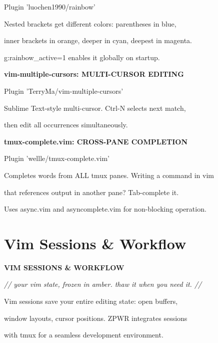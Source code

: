 \documentclass[11pt,a4paper,twoside]{book}
\begin{document}
Plugin 'luochen1990/rainbow'

Nested brackets get different colors: parentheses in blue,

inner brackets in orange, deeper in cyan, deepest in magenta.

g:rainbow\_active=1 enables it globally on startup.


\vspace{12pt}
{\bfseries\color{neonyellow} vim-multiple-cursors: MULTI-CURSOR EDITING}\vspace{4pt}

Plugin 'TerryMa/vim-multiple-cursors'

Sublime Text-style multi-cursor. Ctrl-N selects next match,

then edit all occurrences simultaneously.


\vspace{12pt}
{\bfseries\color{neonyellow} tmux-complete.vim: CROSS-PANE COMPLETION}\vspace{4pt}

\begin{codebox}
Plugin 'wellle/tmux-complete.vim'\\
\end{codebox}

Completes words from ALL tmux panes. Writing a command in vim

that references output in another pane? Tab-complete it.

Uses async.vim and asyncomplete.vim for non-blocking operation.


\vspace{16pt}

\section{Vim Sessions \& Workflow}


\vspace{10pt}
{\large\bfseries\color{neoncyan} VIM SESSIONS \& WORKFLOW}\vspace{6pt}

{\small\itshape\color{dimtext} // your vim state, frozen in amber. thaw it when you need it. //}

Vim sessions save your entire editing state: open buffers,

window layouts, cursor positions. ZPWR integrates sessions

\begin{codebox}
with tmux for a seamless development environment.\\
\end{codebox}
\end{document}
